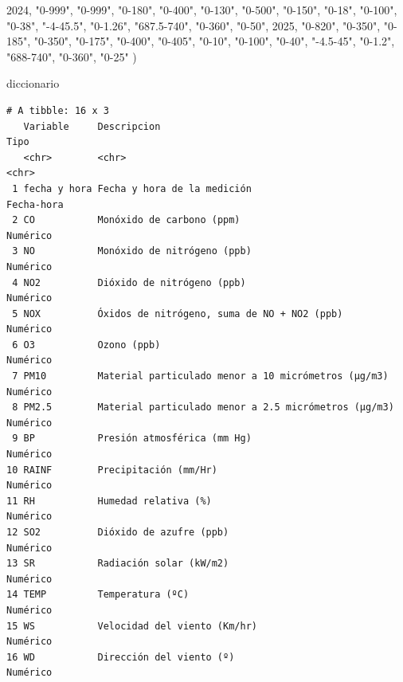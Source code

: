 \documentclass[
  letterpaper,
  DIV=11,
  numbers=noendperiod]{scrartcl}
\newenvironment{Shaded}{\begin{snugshade}}{\end{snugshade}}
\newcommand{\DecValTok}[1]{\textcolor[rgb]{0.68,0.00,0.00}{#1}}
\newcommand{\NormalTok}[1]{\textcolor[rgb]{0.00,0.23,0.31}{#1}}
\newcommand{\StringTok}[1]{\textcolor[rgb]{0.13,0.47,0.30}{#1}}
\begin{document}
\begin{Shaded}
\begin{Highlighting}[]
  \DecValTok{2024}\NormalTok{, }\StringTok{"0{-}999"}\NormalTok{, }\StringTok{"0{-}999"}\NormalTok{, }\StringTok{"0{-}180"}\NormalTok{, }\StringTok{"0{-}400"}\NormalTok{, }\StringTok{"0{-}130"}\NormalTok{, }\StringTok{"0{-}500"}\NormalTok{, }\StringTok{"0{-}150"}\NormalTok{, }\StringTok{"0{-}18"}\NormalTok{, }\StringTok{"0{-}100"}\NormalTok{, }\StringTok{"0{-}38"}\NormalTok{, }\StringTok{"{-}4{-}45.5"}\NormalTok{, }\StringTok{"0{-}1.26"}\NormalTok{, }\StringTok{"687.5{-}740"}\NormalTok{, }\StringTok{"0{-}360"}\NormalTok{, }\StringTok{"0{-}50"}\NormalTok{,}
  \DecValTok{2025}\NormalTok{, }\StringTok{"0{-}820"}\NormalTok{, }\StringTok{"0{-}350"}\NormalTok{, }\StringTok{"0{-}185"}\NormalTok{, }\StringTok{"0{-}350"}\NormalTok{, }\StringTok{"0{-}175"}\NormalTok{, }\StringTok{"0{-}400"}\NormalTok{, }\StringTok{"0{-}405"}\NormalTok{, }\StringTok{"0{-}10"}\NormalTok{, }\StringTok{"0{-}100"}\NormalTok{, }\StringTok{"0{-}40"}\NormalTok{, }\StringTok{"{-}4.5{-}45"}\NormalTok{, }\StringTok{"0{-}1.2"}\NormalTok{, }\StringTok{"688{-}740"}\NormalTok{, }\StringTok{"0{-}360"}\NormalTok{, }\StringTok{"0{-}25"}
\NormalTok{)}

\NormalTok{diccionario}
\end{Highlighting}
\end{Shaded}

\begin{verbatim}
# A tibble: 16 x 3
   Variable     Descripcion                                          Tipo      
   <chr>        <chr>                                                <chr>     
 1 fecha y hora Fecha y hora de la medición                          Fecha-hora
 2 CO           Monóxido de carbono (ppm)                            Numérico  
 3 NO           Monóxido de nitrógeno (ppb)                          Numérico  
 4 NO2          Dióxido de nitrógeno (ppb)                           Numérico  
 5 NOX          Óxidos de nitrógeno, suma de NO + NO2 (ppb)          Numérico  
 6 O3           Ozono (ppb)                                          Numérico  
 7 PM10         Material particulado menor a 10 micrómetros (µg/m3)  Numérico  
 8 PM2.5        Material particulado menor a 2.5 micrómetros (µg/m3) Numérico  
 9 BP           Presión atmosférica (mm Hg)                          Numérico  
10 RAINF        Precipitación (mm/Hr)                                Numérico  
11 RH           Humedad relativa (%)                                 Numérico  
12 SO2          Dióxido de azufre (ppb)                              Numérico  
13 SR           Radiación solar (kW/m2)                              Numérico  
14 TEMP         Temperatura (ºC)                                     Numérico  
15 WS           Velocidad del viento (Km/hr)                         Numérico  
16 WD           Dirección del viento (º)                             Numérico  
\end{verbatim}
\end{document}
